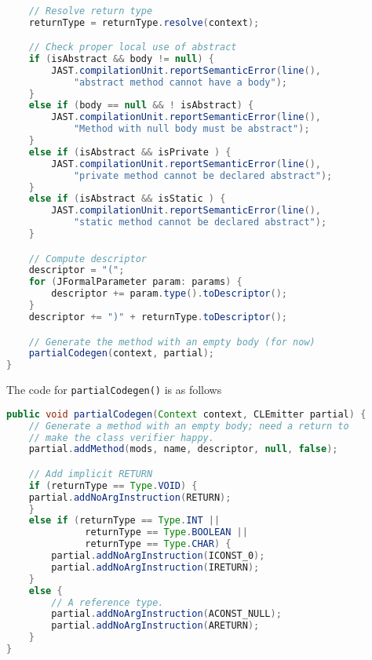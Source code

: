 \documentclass[8pt,a4paper,compress]{beamer}
\begin{document}
\begin{frame}[fragile]
\pause

\begin{lstlisting}[language=Java]

    // Resolve return type
    returnType = returnType.resolve(context);

    // Check proper local use of abstract
    if (isAbstract && body != null) {
        JAST.compilationUnit.reportSemanticError(line(),
            "abstract method cannot have a body");
    }
    else if (body == null && ! isAbstract) {
        JAST.compilationUnit.reportSemanticError(line(),
            "Method with null body must be abstract");
    }
    else if (isAbstract && isPrivate ) {
        JAST.compilationUnit.reportSemanticError(line(),
            "private method cannot be declared abstract");
    }
    else if (isAbstract && isStatic ) {
        JAST.compilationUnit.reportSemanticError(line(),
            "static method cannot be declared abstract");
    }

    // Compute descriptor
    descriptor = "(";
    for (JFormalParameter param: params) {
        descriptor += param.type().toDescriptor();
    }
    descriptor += ")" + returnType.toDescriptor();

    // Generate the method with an empty body (for now)
    partialCodegen(context, partial);
}
\end{lstlisting}
\end{frame}

\begin{frame}[fragile]
\pause

The code for \lstinline{partialCodegen()} is as follows
\begin{lstlisting}[language=Java]
public void partialCodegen(Context context, CLEmitter partial) {
    // Generate a method with an empty body; need a return to
    // make the class verifier happy.
    partial.addMethod(mods, name, descriptor, null, false);

    // Add implicit RETURN
    if (returnType == Type.VOID) {
	partial.addNoArgInstruction(RETURN);
    }
    else if (returnType == Type.INT ||
              returnType == Type.BOOLEAN ||
              returnType == Type.CHAR) {
        partial.addNoArgInstruction(ICONST_0);
        partial.addNoArgInstruction(IRETURN);
    }
    else {
        // A reference type.
        partial.addNoArgInstruction(ACONST_NULL);
        partial.addNoArgInstruction(ARETURN);
    }
}
\end{lstlisting}
\end{frame}
\end{document}
